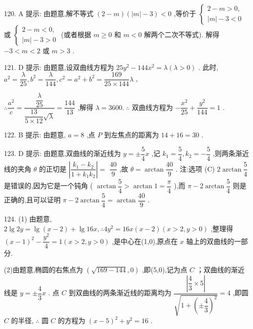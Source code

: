 120. A 提示: 由题意,解不等式 $\left( {2 - m}\right) \left( {\left| m\right|  - 3}\right)  < 0$ ,等价于 $\left\{  \begin{array}{l} 2 - m > 0, \\  \left| m\right|  - 3 < 0 \end{array}\right.$ 或 $\left\{  \begin{array}{l} 2 - m < 0, \\  \left| m\right|  - 3 > 0 \end{array}\right.$ (或者根据 $m \geq  0$ 和 $m < 0$ 解两个二次不等式). 解得 $- 3 < m < 2$ 或 $m > 3$ .

121. D 提示: 由题意,设双曲线方程为 ${25}{y}^{2} - {144}{x}^{2} = \lambda \left( {\lambda  > 0}\right)$ . 此时, ${a}^{2} = \dfrac{\lambda }{25},{b}^{2} = \dfrac{\lambda }{144},{c}^{2} = {a}^{2} + {b}^{2} = \dfrac{169}{{25} \times  {144}}\lambda$ ,

$\therefore \dfrac{{a}^{2}}{c} = \dfrac{\dfrac{\lambda }{25}}{\dfrac{13}{5 \times  {12}}\sqrt{\lambda }} = \dfrac{144}{13}$ ,解得 $\lambda  = {3600}.\;\therefore$ 双曲线方程为 $- \dfrac{{x}^{2}}{25} + \dfrac{{y}^{2}}{144} = 1$ .

122. B 提示: 由题意, $a = 8$ ,点 $P$ 到左焦点的距离为 ${14} + {16} = {30}$ .

123. D 提示: 由题意,双曲线的渐近线为 $y =  \pm  \dfrac{5}{4}x$ ,记 ${k}_{1} = \dfrac{5}{4},{k}_{2} =  - \dfrac{5}{4}$ ,则两条渐近线的夹角 $\theta$ 的正切是 $\left| \dfrac{{k}_{1} - {k}_{2}}{1 + {k}_{1}{k}_{2}}\right|  =$  $\dfrac{40}{9}$ ,故 $\theta  = \arctan \dfrac{40}{9}$ . 注:选项 (C) $2\arctan \dfrac{5}{4}$ 是错误的,因为它是一个钝角 ( $\arctan \dfrac{5}{4} > \arctan 1 = \dfrac{\pi }{4}$ ),而 $\pi  - 2\arctan \dfrac{5}{4}$ 则是正确的,且可以证明 $\pi  - 2\arctan \dfrac{5}{4} = \arctan \dfrac{40}{9}$ .

124. (1) 由题意, $2\lg {2y} = \lg \left( {x - 2}\right)  + \lg {16x},\therefore 4{y}^{2} = {16x}\left( {x - 2}\right) \left( {x > 2,y > 0}\right)$ ,整理得 ${\left( x - 1\right) }^{2} - \dfrac{{y}^{2}}{4} = 1\left( {x > 2,y > 0}\right)$ ,是中心在(1,0),原点在 $x$ 轴上的双曲线的一部分.

(2)由题意,椭圆的右焦点为 $\left( {\sqrt{{169} - {144}},0}\right)$ ,即(5,0),记为点 $C$ ；双曲线的渐近线是 $y =  \pm  \dfrac{4}{3}x$ . 点 $C$ 到双曲线的两条渐近线的距离均为 $\dfrac{\left| \dfrac{4}{3} \times  5\right| }{\sqrt{1 + {\left( \pm \dfrac{4}{3}\right) }^{2}}} = 4$ ,即圆 $C$ 的半径, $\therefore$ 圆 $C$ 的方程为 ${\left( x - 5\right) }^{2} + {y}^{2} = {16}$ .

